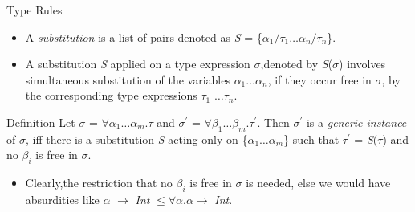 \documentclass{beamer}
\begin{document}
\begin{frame}[fragile]{Type Rules}
\begin{itemize}
\item A \textit{substitution} is a list of pairs denoted as \textit{S} = \{\begin{math}\alpha_1/\tau_1 \ldots \alpha_n/\tau_n \end{math}\}.
\item A substitution \textit{S} applied on a type expression \(\sigma\),denoted by \textit{S}(\(\sigma\)) involves simultaneous substitution of the variables \(\alpha_1 \ldots \alpha_n\), if they occur free in \(\sigma\), by the corresponding type expressions \(\tau_1\) \(\ldots \tau_n\).
\end{itemize}
\begin{block}{Definition}
Let \( \sigma \) = \( \forall \alpha_1 \ldots \alpha_m \).\( \tau \) and \( \sigma^\prime\) = \(\forall\beta_1 \ldots \beta_m\).\(\tau^\prime\). Then \(\sigma^\prime\) is a {\it generic instance} of \(\sigma\), iff there is a substitution \textit{S} acting only on \{\(\alpha_1 \ldots \alpha_m\)\} such that \(\tau^\prime\) = \textit{S}(\(\tau\)) and no \(\beta_i\) is free in \(\sigma\).
\end{block}
\begin{itemize}
\item Clearly,the restriction that no \(\beta_i\) is free in \(\sigma\) is needed, else we would have absurdities like \(\alpha\) \(\rightarrow\) {\it Int} \(\leq \forall \alpha\).\(\alpha \rightarrow\) {\it Int}.
\end{itemize}
\end{frame}
\end{document}
